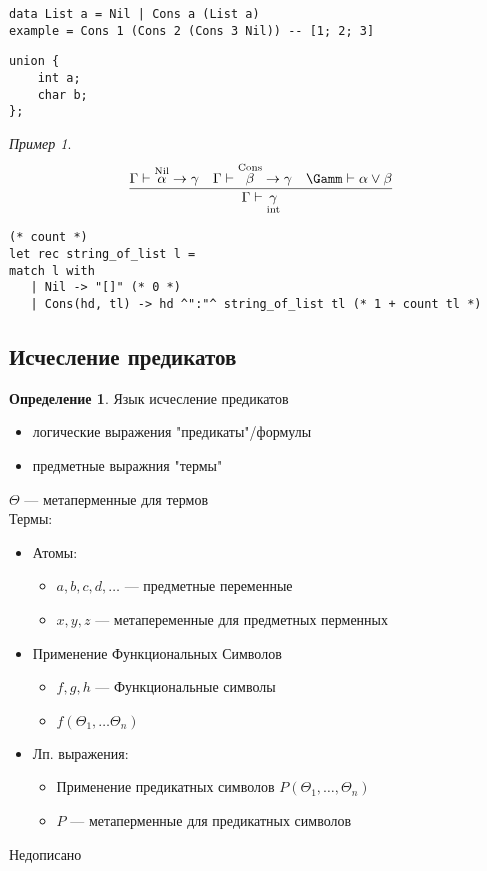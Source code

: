 \documentclass[english]{article}
\theoremstyle{plain}
\theoremstyle{remark}
\newtheorem*{examp}{Пример}
\theoremstyle{definition}
\newtheorem*{definition}{Определение}
\begin{document}
\begin{verbatim}
data List a = Nil | Cons a (List a)
example = Cons 1 (Cons 2 (Cons 3 Nil)) -- [1; 2; 3]
\end{verbatim}
\begin{verbatim}
union {
	int a;
	char b;
};
\end{verbatim}
\begin{examp}
\[
\frac{\Gamma \vdash \overset{\text{Nil}}{\alpha} \to \gamma\quad \Gamma \vdash \overset{\text{Cons}}{\beta} \to \gamma\quad \Gamm \vdash \alpha \vee \beta}{\Gamma \vdash \underset{\text{int}}{\gamma}}
\]
\begin{verbatim}
(* count *)
let rec string_of_list l =
match l with
   | Nil -> "[]" (* 0 *)
   | Cons(hd, tl) -> hd ^":"^ string_of_list tl (* 1 + count tl *)
\end{verbatim}
\end{examp}
\subsection{Исчесление предикатов}
\label{sec:orgf2698fa}
\begin{definition}
Язык исчесление предикатов
\begin{itemize}
\item логические выражения "предикаты"/формулы
\item предметные выражния "термы"
\end{itemize}
\(\Theta\) --- метаперменные для термов \\
Термы:
\begin{itemize}
\item Атомы:
\begin{itemize}
\item \(a, b, c, d, \dots\) --- предметные переменные
\item \(x, y, z\) --- метапеременные для предметных перменных
\end{itemize}
\item Применение Функциональных Символов
\begin{itemize}
\item \(f, g, h\) --- Функциональные символы
\item \(f(\Theta_1, \dots \Theta_n)\)
\end{itemize}
\item Лп. выражения:
\begin{itemize}
\item Применение предикатных символов \(P(\Theta_1, \dots, \Theta_n)\)
\item \(P\) --- метаперменные для предикатных символов
\end{itemize}
\end{itemize}
\color{red}Недописано\color{black}
\end{definition}
\end{document}
